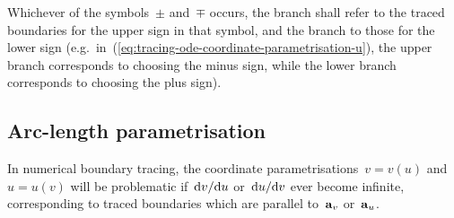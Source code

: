 Whichever of the symbols~$\pm$ and~$\mp$ occurs,
the  branch shall refer to
the traced boundaries for the upper sign in that symbol,
and the  branch to those for the lower sign
(e.g.~in~(\ref{eq:tracing-ode-coordinate-parametrisation-u}),
the upper branch corresponds to choosing the minus sign,
while the lower branch corresponds to choosing the plus sign).

\subsection{Arc-length parametrisation}
\label{sec:curvilinear.tracing.arc-length}

In numerical boundary tracing,
the coordinate parametrisations~$v = v (u)$ and~$u = u (v)$
will be problematic
if~$\mathop{}\!\mathrm{d} v / {\mathop{}\!\mathrm{d} u}$ or~$\mathop{}\!\mathrm{d} u / {\mathop{}\!\mathrm{d} v}$ ever become infinite,
corresponding to traced boundaries
which are parallel to~$\mathop{}\!\boldsymbol{\mathbf{a}}_{v}$ or~$\mathop{}\!\boldsymbol{\mathbf{a}}_{u}$.

